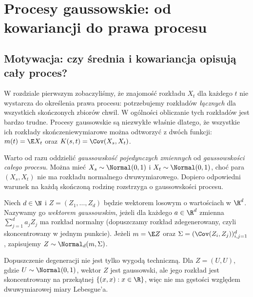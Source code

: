 \chapter{Procesy gaussowskie: od kowariancji do prawa procesu}
\label{ch:gauss}

\section{Motywacja: czy średnia i kowariancja opisują cały proces?}
W rozdziale pierwszym zobaczyliśmy, że znajomość rozkładu $X_t$ dla
każdego $t$ nie wystarcza do określenia prawa procesu: potrzebujemy
rozkładów \emph{łącznych} dla wszystkich skończonych zbiorów chwil.
W ogólności obliczanie tych rozkładów jest bardzo trudne. Procesy
gaussowskie są niezwykłe właśnie dlatego, że wszystkie ich rozkłady
skończeniewymiarowe można odtworzyć z dwóch funkcji:
$m(t)=\E X_t$ oraz $K(s,t)=\Cov(X_s,X_t)$.

Warto od razu oddzielić \emph{gaussowskość pojedynczych zmiennych}
od \emph{gaussowskości całego procesu}. Można mieć $X_s\sim\Normal(0,1)$
i $X_t\sim\Normal(0,1)$, choć para $(X_s,X_t)$ nie ma rozkładu
normalnego dwuwymiarowego. Dopiero odpowiedni warunek na każdą
skończoną rodzinę rozstrzyga o gaussowskości procesu.

\begin{definicja}
Niech $d\in\N$ i $Z=(Z_1,\ldots,Z_d)$ będzie wektorem losowym
o wartościach w $\R^d$. Nazywamy go \emph{wektorem gaussowskim},
jeżeli dla każdego $a\in\R^d$ zmienna $\sum_{j=1}^d a_jZ_j$
ma rozkład normalny (dopuszczamy rozkład zdegenerowany, czyli
skoncentrowany w jednym punkcie). Jeżeli $m=\E Z$ oraz
$\Sigma=(\Cov(Z_i,Z_j))_{i,j=1}^d$, zapisujemy
$Z\sim\Normal_d(m,\Sigma)$.
\end{definicja}

Dopuszczenie degeneracji nie jest tylko wygodą techniczną. Dla
$Z=(U,U)$, gdzie $U\sim\Normal(0,1)$, wektor $Z$ jest gaussowski,
ale jego rozkład jest skoncentrowany na przekątnej $\{(x,x):x\in\R\}$,
więc nie ma gęstości względem dwuwymiarowej miary Lebesgue'a.


